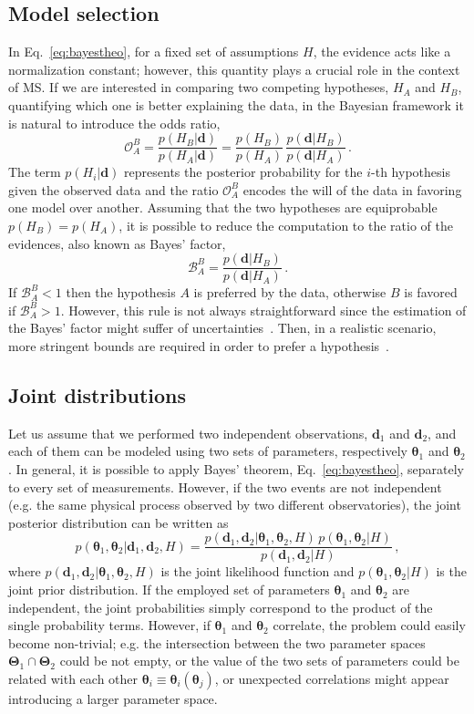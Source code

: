 \documentclass[prd,aps,twocolumn,a4paper,showkeys,nofootinbib,floatfix]{revtex4-1}
\newcommand{\be}{\begin{equation}}
\newcommand{\ee}{\end{equation}}
\def\B{\mathcal{B}}
\def\O{\mathcal{O}}
\def\params{\boldsymbol{\theta}}
\def\paramspace{\boldsymbol{\Theta}}
\def\data{\textbf{d}}
\begin{document}
\subsection{Model selection}
\label{sec:ms}

In Eq.~\eqref{eq:bayestheo}, for a fixed set of assumptions $H$, 
the evidence acts like a normalization constant;
however, this quantity plays a crucial role in the context of MS.
If we are interested in comparing two competing hypotheses, $H_A$ and $H_B$, 
quantifying which one is better explaining the data,
in the Bayesian framework it is natural to introduce the odds ratio,
\be
\label{eq:oddratio}
\O_A^B = \frac{p(H_B|\data)}{p(H_A|\data)} = \frac{p(H_B)}{p(H_A)} \, \frac{p(\data|H_B)}{p(\data|H_A)}\,.
\ee  
The term $p(H_i|\data)$ represents the posterior probability for the $i$-th hypothesis given the observed data
and the ratio $\O_A^B$ encodes the will of the data in 
favoring one model over another.
Assuming that the two hypotheses are equiprobable $p(H_B)=p(H_A)$, 
it is possible to reduce the computation to the ratio of the evidences, also known as Bayes' factor,
\be
\label{eq:bayesfact}
\B_A^B = \frac{p(\data|H_B)}{p(\data|H_A)}\,.
\ee  
If $\B_A^B < 1$ then the hypothesis $A$ is preferred by the data,
otherwise $B$ is favored if $\B_A^B > 1$.
However, this rule is not always straightforward since 
the estimation of the Bayes' factor might suffer of uncertainties~\cite{mattei2020parsimonious,Yao:2019}.
Then, in a realistic scenario,
more stringent bounds are required in order to prefer a hypothesis~\cite{Kass:1995}.


\subsection{Joint distributions}

Let us assume that we performed two independent 
observations, $\data_1$ and $\data_2$, 
and each of them can be modeled  using two sets of parameters, 
respectively $\params_1$ and $\params_2$.
In general, it is possible to apply Bayes' theorem, Eq.~\eqref{eq:bayestheo},
separately to every set of measurements.
However, if the two events are not independent
(e.g. the same physical process observed by two different observatories),
 the joint posterior distribution can be written as 
 \be
 \label{eq:bayesjoint}
 p(\params_1,\params_2|\data_1,\data_2,H) = \frac{p(\data_1,\data_2|\params_1,\params_2,H) \, p(\params_1,\params_2|H)}{p(\data_1,\data_2|H)}\,,
 \ee
where $p(\data_1,\data_2|\params_1,\params_2,H)$ is the joint likelihood function and
$p(\params_1,\params_2|H)$ is the joint prior distribution.
If the employed set of parameters $\params_1$ and 
$\params_2$ are independent, the joint probabilities simply correspond to the product of the single probability terms.
However, if $\params_1$ and $\params_2$ correlate,
the problem could easily become non-trivial; e.g.
 the intersection between the two parameter spaces $\paramspace_1 \cap \paramspace_2$ could be not empty,
 or the value of the two sets of parameters could be related with each other $\params_i\equiv \params_i(\params_j)$,
 or unexpected correlations might appear introducing a larger parameter space.
 
\end{document}
